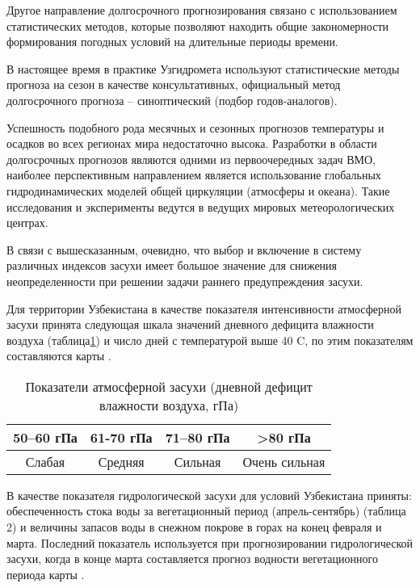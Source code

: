 Другое направление долгосрочного прогнозирования связано с использованием статистических методов, которые позволяют находить общие закономерности формирования погодных условий на длительные периоды времени.

В настоящее время в практике Узгидромета используют статистические методы прогноза на сезон в качестве консультативных, официальный метод долгосрочного прогноза – синоптический (подбор годов-аналогов).

Успешность подобного рода месячных и сезонных прогнозов температуры и осадков во всех регионах мира недостаточно высока. Разработки в области долгосрочных прогнозов являются одними из первоочередных задач ВМО, наиболее перспективным направлением является использование глобальных гидродинамических моделей общей циркуляции (атмосферы и океана). Такие исследования и эксперименты ведутся в ведущих мировых метеорологических центрах.

В связи с вышесказанным, очевидно, что выбор и включение в систему различных индексов засухи имеет большое значение для снижения неопределенности при решении задачи раннего предупреждения засухи.

Для территории Узбекистана в качестве показателя интенсивности атмосферной засухи принята следующая шкала значений дневного дефицита влажности воздуха (таблица\ref{tb_atm_drouth}) и число дней с температурой выше 40 \textdegree C, по этим показателям составляются карты \cite{Chub2007}.

\begin{table}[!tb]
	\centering
	\caption{Показатели атмосферной засухи (дневной дефицит влажности воздуха, гПа)}\label{tb_atm_drouth}
	\begin{DoubleSpace}
	\begin{tabular}{| c | c | c | c |}
		\hline
		\hline
		50--60 гПа & 61-70 гПа & 71--80 гПа & >80 гПа \\ 

		\hline

		Слабая & Средняя & Сильная & Очень сильная \\ 

		\hline
		\hline
	\end{tabular}
	\end{DoubleSpace}
\end{table}

В качестве показателя гидрологической засухи для условий Узбекистана приняты: обеспеченность стока воды за вегетационный период (апрель-сентябрь) (таблица 2) и величины запасов воды в снежном покрове в горах на конец февраля и марта. Последний показатель используется при прогнозировании гидрологической засухи, когда в конце марта составляется прогноз водности вегетационного периода карты \cite{Chub2007}.

